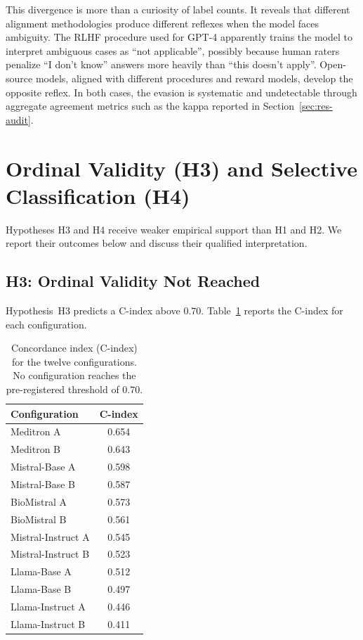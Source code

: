 This divergence is more than a curiosity of label counts. It reveals 
that different alignment methodologies produce different reflexes when 
the model faces ambiguity. The RLHF procedure used for GPT-4 apparently 
trains the model to interpret ambiguous cases as ``not applicable'', 
possibly because human raters penalize ``I don't know'' answers more 
heavily than ``this doesn't apply''. Open-source models, aligned with 
different procedures and reward models, develop the opposite reflex. In 
both cases, the evasion is systematic and undetectable through 
aggregate agreement metrics such as the kappa reported in 
Section~\ref{sec:res-audit}.
\section{Ordinal Validity (H3) and Selective Classification (H4)}
\label{sec:res-h3h4}

Hypotheses H3 and H4 receive weaker empirical support than H1 and H2. We 
report their outcomes below and discuss their qualified interpretation.

\subsection{H3: Ordinal Validity Not Reached}
\label{subsec:res-h3}

Hypothesis~H3 predicts a C-index above $0.70$. Table~\ref{tab:res-h3} 
reports the C-index for each configuration.

\begin{table}[htbp]
    \centering
    \caption{Concordance index (C-index) for the twelve configurations. 
        No configuration reaches the pre-registered threshold of $0.70$.}
    \label{tab:res-h3}
    \small
    \begin{tabular}{@{}lc@{}}
        \toprule
        \textbf{Configuration} & \textbf{C-index} \\
        \midrule
        Meditron A         & 0.654 \\
        Meditron B         & 0.643 \\
        Mistral-Base A     & 0.598 \\
        Mistral-Base B     & 0.587 \\
        BioMistral A       & 0.573 \\
        BioMistral B       & 0.561 \\
        Mistral-Instruct A & 0.545 \\
        Mistral-Instruct B & 0.523 \\
        Llama-Base A       & 0.512 \\
        Llama-Base B       & 0.497 \\
        Llama-Instruct A   & 0.446 \\
        Llama-Instruct B   & 0.411 \\
        \bottomrule
    \end{tabular}
\end{table}

